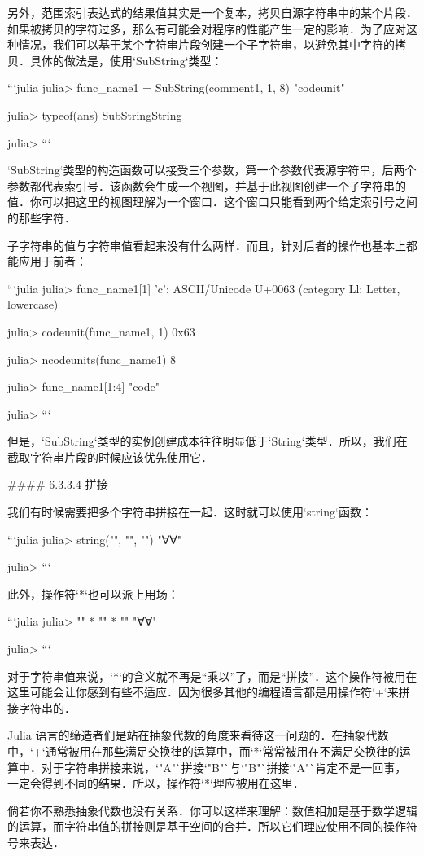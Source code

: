 另外，范围索引表达式的结果值其实是一个复本，拷贝自源字符串中的某个片段．如果被拷贝的字符过多，那么有可能会对程序的性能产生一定的影响．为了应对这种情况，我们可以基于某个字符串片段创建一个子字符串，以避免其中字符的拷贝．具体的做法是，使用`SubString`类型：

```julia
julia> func_name1 = SubString(comment1, 1, 8)
"codeunit"

julia> typeof(ans)
SubString{String}

julia> 
```

`SubString`类型的构造函数可以接受三个参数，第一个参数代表源字符串，后两个参数都代表索引号．该函数会生成一个视图，并基于此视图创建一个子字符串的值．你可以把这里的视图理解为一个窗口．这个窗口只能看到两个给定索引号之间的那些字符．

子字符串的值与字符串值看起来没有什么两样．而且，针对后者的操作也基本上都能应用于前者：

```julia
julia> func_name1[1]
'c': ASCII/Unicode U+0063 (category Ll: Letter, lowercase)

julia> codeunit(func_name1, 1)
0x63

julia> ncodeunits(func_name1)
8

julia> func_name1[1:4]
"code"

julia> 
```

但是，`SubString`类型的实例创建成本往往明显低于`String`类型．所以，我们在截取字符串片段的时候应该优先使用它．

#### 6.3.3.4 拼接

我们有时候需要把多个字符串拼接在一起．这时就可以使用`string`函数：

```julia
julia> string("", "", "")
"∀∀"

julia> 
```

此外，操作符`*`也可以派上用场：

```julia
julia> "" * "" * ""
"∀∀"

julia> 
```

对于字符串值来说，`*`的含义就不再是“乘以”了，而是“拼接”．这个操作符被用在这里可能会让你感到有些不适应．因为很多其他的编程语言都是用操作符`+`来拼接字符串的．

Julia 语言的缔造者们是站在抽象代数的角度来看待这一问题的．在抽象代数中，`+`通常被用在那些满足交换律的运算中，而`*`常常被用在不满足交换律的运算中．对于字符串拼接来说，`"A"`拼接`"B"`与`"B"`拼接`"A"`肯定不是一回事，一定会得到不同的结果．所以，操作符`*`理应被用在这里．

倘若你不熟悉抽象代数也没有关系．你可以这样来理解：数值相加是基于数学逻辑的运算，而字符串值的拼接则是基于空间的合并．所以它们理应使用不同的操作符号来表达．

